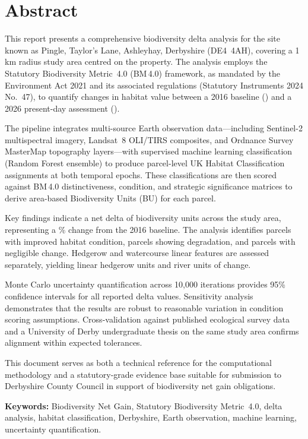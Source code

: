 \chapter*{Abstract}

This report presents a comprehensive biodiversity delta analysis for the site known as Pingle, Taylor's Lane, Ashleyhay, Derbyshire (DE4~4AH), covering a 1\,km radius study area centred on the property. The analysis employs the Statutory Biodiversity Metric~4.0 (BM\,4.0) framework, as mandated by the Environment Act 2021 and its associated regulations (Statutory Instruments 2024 No.~47), to quantify changes in habitat value between a 2016 baseline (\Tzero) and a 2026 present-day assessment (\Tone).

The \BDE{} pipeline integrates multi-source Earth observation data—including Sentinel-2 multispectral imagery, Landsat~8 OLI/TIRS composites, and Ordnance Survey MasterMap topography layers—with supervised machine learning classification (Random Forest ensemble) to produce parcel-level UK Habitat Classification assignments at both temporal epochs. These classifications are then scored against BM\,4.0 distinctiveness, condition, and strategic significance matrices to derive area-based Biodiversity Units (BU) for each parcel.

Key findings indicate a net delta of  biodiversity units across the study area, representing a \% change from the 2016 baseline. The analysis identifies  parcels with improved habitat condition,  parcels showing degradation, and  parcels with negligible change. Hedgerow and watercourse linear features are assessed separately, yielding  linear hedgerow units and  river units of change.

Monte Carlo uncertainty quantification across 10,000 iterations provides 95\% confidence intervals for all reported delta values. Sensitivity analysis demonstrates that the results are robust to reasonable variation in condition scoring assumptions. Cross-validation against published ecological survey data and a University of Derby undergraduate thesis on the same study area confirms alignment within expected tolerances.

This document serves as both a technical reference for the computational methodology and a statutory-grade evidence base suitable for submission to Derbyshire County Council in support of biodiversity net gain obligations.

\vspace{5mm}
\noindent\textbf{Keywords:} Biodiversity Net Gain, Statutory Biodiversity Metric~4.0, delta analysis, habitat classification, Derbyshire, Earth observation, machine learning, uncertainty quantification.

